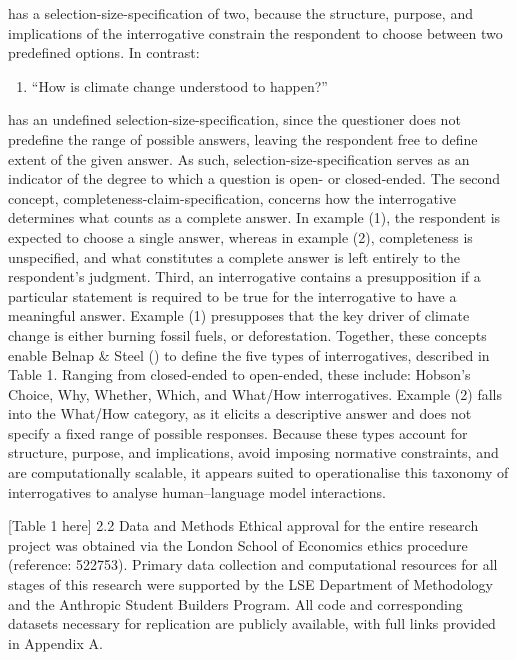 \documentclass[
  12pt,
]{article}
\providecommand{\tightlist}{%
  \setlength{\itemsep}{0pt}\setlength{\parskip}{0pt}}
\begin{document}
has a selection-size-specification of two, because the structure, purpose, and implications of the interrogative constrain the respondent to choose between two predefined options. In contrast:

\begin{enumerate}
\def\labelenumi{(\arabic{enumi})}
\setcounter{enumi}{1}
\tightlist
\item
  ``How is climate change understood to happen?''
\end{enumerate}

has an undefined selection-size-specification, since the questioner does not predefine the range of possible answers, leaving the respondent free to define extent of the given answer. As such, selection-size-specification serves as an indicator of the degree to which a question is open- or closed-ended. The second concept, completeness-claim-specification, concerns how the interrogative determines what counts as a complete answer. In example (1), the respondent is expected to choose a single answer, whereas in example (2), completeness is unspecified, and what constitutes a complete answer is left entirely to the respondent's judgment. Third, an interrogative contains a presupposition if a particular statement is required to be true for the interrogative to have a meaningful answer. Example (1) presupposes that the key driver of climate change is either burning fossil fuels, or deforestation. Together, these concepts enable Belnap \& Steel () to define the five types of interrogatives, described in Table 1. Ranging from closed-ended to open-ended, these include: Hobson's Choice, Why, Whether, Which, and What/How interrogatives. Example (2) falls into the What/How category, as it elicits a descriptive answer and does not specify a fixed range of possible responses. Because these types account for structure, purpose, and implications, avoid imposing normative constraints, and are computationally scalable, it appears suited to operationalise this taxonomy of interrogatives to analyse human--language model interactions.

{[}Table 1 here{]}
2.2 Data and Methods
Ethical approval for the entire research project was obtained via the London School of Economics ethics procedure (reference: 522753). Primary data collection and computational resources for all stages of this research were supported by the LSE Department of Methodology and the Anthropic Student Builders Program. All code and corresponding datasets necessary for replication are publicly available, with full links provided in Appendix A.
\end{document}
